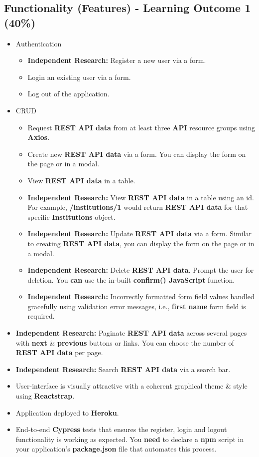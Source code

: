 \documentclass{article}
\begin{document}
\subsection*{Functionality (Features) - Learning Outcome 1 (40\%)}
\begin{itemize}
	\item Authentication
	      \begin{itemize}
	      	\item \textbf{Independent Research:} Register a new user via a form.
	      	\item Login an existing user via a form.
	      	\item Log out of the application.
	      \end{itemize}
	\item CRUD
	      \begin{itemize}
	      	\item Request \textbf{REST API data} from at least three \textbf{API} resource groups using \textbf{Axios}.
	      	\item Create new \textbf{REST API data} via a form. You can display the form on the page or in a modal. 
	      	\item View \textbf{REST API data} in a table.
	      	\item \textbf{Independent Research:} View \textbf{REST API data} in a table using an id. For example, \textbf{/institutions/1} would return \textbf{REST API data} for that specific \textbf{Institutions} object.
	      	\item \textbf{Independent Research:} Update \textbf{REST API data} via a form. Similar to creating \textbf{REST API data}, you can display the form on the page or in a modal. 
	      	\item \textbf{Independent Research:} Delete \textbf{REST API data}. Prompt the user for deletion. You \textbf{can} use the in-built \textbf{confirm() JavaScript} function. 
	      	\item \textbf{Independent Research:} Incorrectly formatted form field values handled gracefully using validation error messages, i.e., \textbf{first name} form field is required.
	      \end{itemize}
	\item \textbf{Independent Research:} Paginate \textbf{REST API data} across several pages with \textbf{next} \& \textbf{previous} buttons or links. You can choose the number of \textbf{REST API data} per page.
	\item \textbf{Independent Research:} Search \textbf{REST API data} via a search bar.
	\item User-interface is visually attractive with a coherent graphical theme \& style using \textbf{Reactstrap}.
	\item Application deployed to \textbf{Heroku}. 
	\item End-to-end \textbf{Cypress} tests that ensures the register, login and logout functionality is working as expected. You \textbf{need} to declare a \textbf{npm} script in your application's \textbf{package.json} file that automates this process.
\end{itemize}
\end{document}
